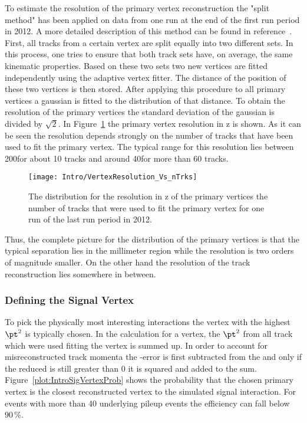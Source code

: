 To estimate the resolution of the primary vertex reconstruction the "split method" has been applied on data from one run at the end of the first run period in 2012. A more detailed description of this method can be found in reference~. First, all tracks from a certain vertex are split equally into two different sets. In this process, one tries to ensure that both track sets have, on average, the same kinematic properties. Based on these two sets two new vertices are fitted independently using the adaptive vertex fitter. The distance of the position of these two vertices is then stored. After applying this procedure to all primary vertices a gaussian is fitted to the distribution of that distance. To obtain the resolution of the primary vertices the standard deviation of the gaussian is divided by $\sqrt{2}$. In Figure~\ref{plot:IntroVertexRes} the primary vertex resolution in z is shown. As it can be seen the resolution depends strongly on the number of tracks that have been used to fit the primary vertex. The typical range for this resolution lies between 200\mum for about 10 tracks and around 40\mum for more than 60 tracks.

\begin{figure}[!Hhtb]
  \centering
  \texttt{[image: Intro/VertexResolution\_Vs\_nTrks]}
  \caption[Vertex resolution \vs number of used tracks]{The distribution for the resolution in z of the primary vertices \vs the number of tracks that were used to fit the primary vertex for one run of the last run period in 2012. \label{plot:IntroVertexRes}}
\end{figure}

Thus, the complete picture for the distribution of the primary vertices is that the typical separation lies in the millimeter region while the resolution is two orders of magnitude smaller. On the other hand the resolution of the track reconstruction lies somewhere in between.

\subsubsection{Defining the Signal Vertex\label{sec:IntroSigVer}}

To pick the physically most interesting interactions the vertex with the highest $\pt^{2}$ is typically chosen. In the calculation for a vertex, the $\pt^{2}$ from all track which were used fitting the vertex is summed up. In order to account for misreconstructed track momenta the \pt-error is first subtracted from the \pt and only if the reduced \pt is still greater than 0 it is squared and added to the sum. Figure~\ref{plot:IntroSigVertexProb} shows the probability that the chosen primary vertex is the closest reconstructed vertex to the simulated signal interaction. For events with more than 40 underlying pileup events the efficiency can fall below $90\,{}\%{}$.

